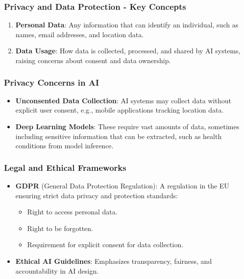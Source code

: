 \documentclass{beamer}
\begin{document}
\begin{frame}[fragile]
    \frametitle{Privacy and Data Protection - Key Concepts}
    \begin{enumerate}
        \item \textbf{Personal Data}: 
        Any information that can identify an individual, such as names, email addresses, and location data.
        
        \item \textbf{Data Usage}: 
        How data is collected, processed, and shared by AI systems, raising concerns about consent and data ownership.
    \end{enumerate}
\end{frame}

\begin{frame}[fragile]
    \frametitle{Privacy Concerns in AI}
    \begin{itemize}
        \item \textbf{Unconsented Data Collection}: 
        AI systems may collect data without explicit user consent, e.g., mobile applications tracking location data.
        
        \item \textbf{Deep Learning Models}: 
        These require vast amounts of data, sometimes including sensitive information that can be extracted, such as health conditions from model inference.
    \end{itemize}
\end{frame}

\begin{frame}[fragile]
    \frametitle{Legal and Ethical Frameworks}
    \begin{itemize}
        \item \textbf{GDPR} (General Data Protection Regulation): 
        A regulation in the EU ensuring strict data privacy and protection standards:
        \begin{itemize}
            \item Right to access personal data.
            \item Right to be forgotten.
            \item Requirement for explicit consent for data collection.
        \end{itemize}
        
        \item \textbf{Ethical AI Guidelines}: 
        Emphasizes transparency, fairness, and accountability in AI design.
    \end{itemize}
\end{frame}
\end{document}
